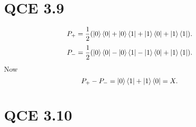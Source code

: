 \documentclass[10pt]{article}
\begin{document}
\section*{QCE 3.9}
\[
P_+ = \frac{1}{2} ( \ket{0} \bra{0} + \ket{0} \bra{1} +\ket{1} \bra{0} +\ket{1} \bra{1}).
\]
\[
P_- = \frac{1}{2} (\ket{0} \bra{0} - \ket{0} \bra{1} -\ket{1} \bra{0} +\ket{1} \bra{1}).
\]
Now 
\[
P_+ - P_- = \ket{0} \bra{1} + \ket{1} \bra{0} = X.
\]

\section*{QCE 3.10}
\end{document}
